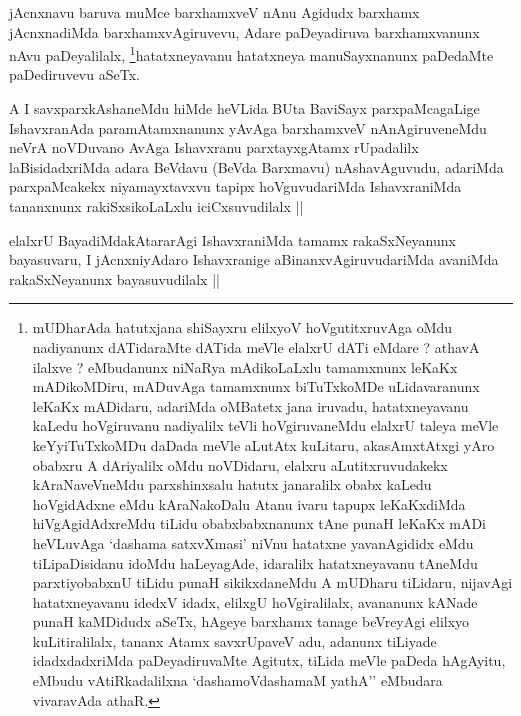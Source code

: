 
\begin{artha}
jAcnxnavu baruva muMce barxhamxveV nAnu Agidudx barxhamx jAcnxnadiMda
barxhamxvAgiruvevu, Adare paDeyadiruva barxhamxvanunx nAvu
paDeyalilalx, \footnote{mUDharAda hatutxjana shiSayxru elilxyoV
  hoVgutitxruvAga oMdu nadiyanunx dATidaraMte dATida meVle elalxrU
  dATi eMdare ? athavA ilalxve ? eMbudanunx niNaRya mAdikoLaLxlu
  tamamxnunx leKaKx mADikoMDiru, mADuvAga tamamxnunx biTuTxkoMDe
  uLidavaranunx leKaKx mADidaru, adariMda oMBatetx jana iruvadu,
  hatatxneyavanu kaLedu hoVgiruvanu nadiyalilx teVli hoVgiruvaneMdu
  elalxrU taleya meVle keYyiTuTxkoMDu daDada meVle aLutAtx kuLitaru,
  akasAmxtAtxgi yAro obabxru A dAriyalilx oMdu noVDidaru, elalxru
  aLutitxruvudakekx kAraNaveVneMdu parxshinxsalu hatutx janaralilx
  obabx kaLedu hoVgidAdxne eMdu kAraNakoDalu Atanu ivaru tapupx
  leKaKxdiMda hiVgAgidAdxreMdu tiLidu obabxbabxnanunx tAne punaH
  leKaKx mADi heVLuvAga `dashama satxvXmasi' niVnu hatatxne
  yavanAgididx eMdu tiLipaDisidanu idoMdu haLeyagAde, idaralilx
  hatatxneyavanu tAneMdu parxtiyobabxnU tiLidu punaH sikikxdaneMdu A
  mUDharu tiLidaru, nijavAgi hatatxneyavanu idedxV idadx, elilxgU
  hoVgiralilalx, avananunx kANade punaH kaMDidudx aSeTx, hAgeye
  barxhamx tanage beVreyAgi elilxyo kuLitiralilalx, tananx Atamx
  savxrUpaveV adu, adanunx tiLiyade idadxdadxriMda paDeyadiruvaMte
  Agitutx, tiLida meVle paDeda hAgAyitu, eMbudu vAtiRkadalilxna
  `dashamoVdashamaM yathA'' eMbudara vivaravAda athaR.}hatatxneyavanu hatatxneya manuSayxnanunx
paDedaMte paDediruvevu aSeTx.
\end{artha}

\begin{artha}
A I savxparxkAshaneMdu hiMde heVLida BUta BaviSayx parxpaMcagaLige
IshavxranAda paramAtamxnanunx yAvAga barxhamxveV nAnAgiruveneMdu neVrA
noVDuvano AvAga Ishavxranu parxtayxgAtamx rUpadalilx laBisidadxriMda
adara BeVdavu (BeVda Barxmavu) nAshavAguvudu, adariMda parxpaMcakekx
niyamayxtavxvu tapipx hoVguvudariMda IshavxraniMda tananxnunx
rakiSxsikoLaLxlu iciCxsuvudilalx ||
\end{artha}


\begin{artha}
elalxrU BayadiMdakAtararAgi IshavxraniMda tamamx rakaSxNeyanunx
bayasuvaru, I jAcnxniyAdaro Ishavxranige aBinanxvAgiruvudariMda
avaniMda rakaSxNeyanunx bayasuvudilalx ||
\end{artha}

